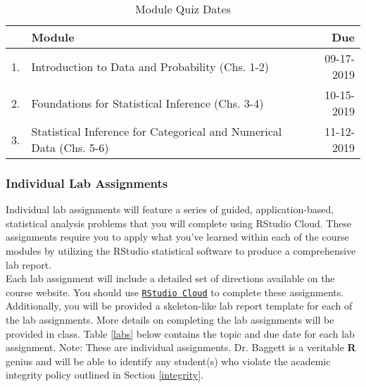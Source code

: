 \documentclass[article]{article}
\begin{document}
\begin{table}[H]
\begin{center}
\caption{Module Quiz Dates}
\vspace{3mm}
\begin{tabular}{llr}
\hline
 & {\bf{Module}} & {\bf{Due}}\\
\hline
1. & Introduction to Data and Probability (Chs. 1-2) & 09-17-2019\\
2. & Foundations for Statistical Inference (Chs. 3-4) & 10-15-2019\\
3. & Statistical Inference for Categorical and Numerical Data (Chs. 5-6) & 11-12-2019\\
\hline
\end{tabular}
\end{center}
\label{iqs}
\end{table}%

\subsubsection{Individual Lab Assignments}\label{sec:labs}
Individual lab assignments will feature a series of guided, application-based, statistical analysis problems that you will complete using RStudio Cloud. These assignments require you to apply what you've learned within each of the course modules by utilizing the RStudio statistical software to produce a comprehensive lab report.\\

Each lab assignment will include a detailed set of directions available on the course website. You should use \href{https://rstudio.cloud/}{\texttt{RStudio Cloud}} to complete these assignments. Additionally, you will be provided a skeleton-like lab report template for each of the lab assignments. More details on completing the lab assignments will be provided in class. Table \ref{labs} below contains the topic and due date for each lab assignment. Note: These are individual assignments. Dr. Baggett is a veritable \textbf{\textsf{R}} genius and will be able to identify any student(s) who violate the academic integrity policy outlined in Section \ref{integrity}.
\end{document}
